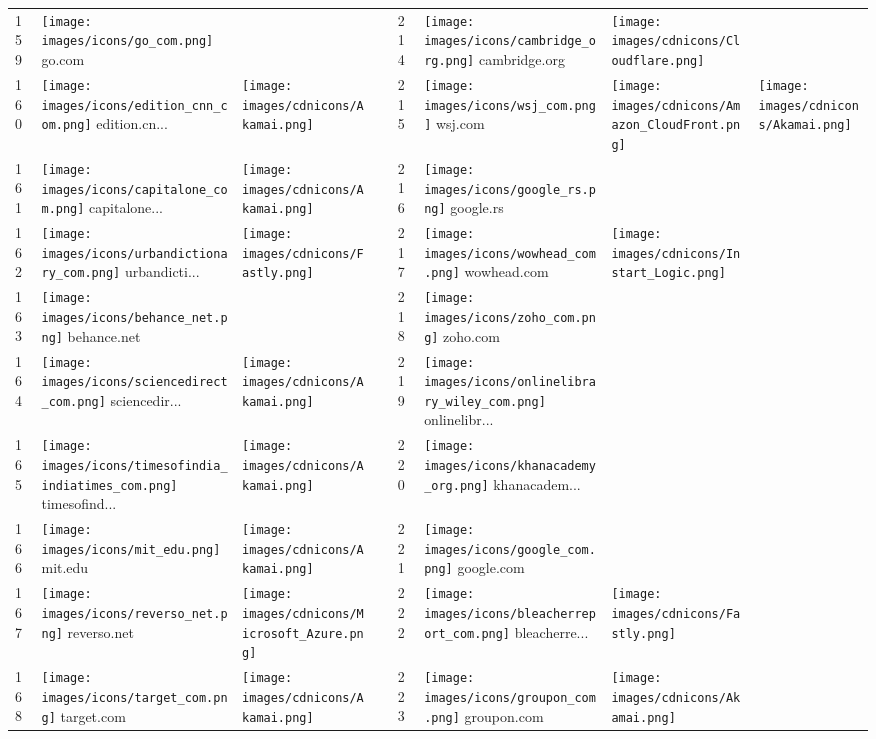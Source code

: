 \begin{table}[tbp]
\begin{tabular}{|llll|llll|}
159 & \texttt{[image: images/icons/go\_com.png]} go.com & & & 214 & \texttt{[image: images/icons/cambridge\_org.png]} cambridge.org & \texttt{[image: images/cdnicons/Cloudflare.png]} & \\
160 & \texttt{[image: images/icons/edition\_cnn\_com.png]} edition.cn... & \texttt{[image: images/cdnicons/Akamai.png]} & & 215 & \texttt{[image: images/icons/wsj\_com.png]} wsj.com & \texttt{[image: images/cdnicons/Amazon\_CloudFront.png]} & \texttt{[image: images/cdnicons/Akamai.png]} \\
161 & \texttt{[image: images/icons/capitalone\_com.png]} capitalone... & \texttt{[image: images/cdnicons/Akamai.png]} & & 216 & \texttt{[image: images/icons/google\_rs.png]} google.rs & & \\
162 & \texttt{[image: images/icons/urbandictionary\_com.png]} urbandicti... & \texttt{[image: images/cdnicons/Fastly.png]} & & 217 & \texttt{[image: images/icons/wowhead\_com.png]} wowhead.com & \texttt{[image: images/cdnicons/Instart\_Logic.png]} & \\
163 & \texttt{[image: images/icons/behance\_net.png]} behance.net & & & 218 & \texttt{[image: images/icons/zoho\_com.png]} zoho.com & & \\
164 & \texttt{[image: images/icons/sciencedirect\_com.png]} sciencedir... & \texttt{[image: images/cdnicons/Akamai.png]} & & 219 & \texttt{[image: images/icons/onlinelibrary\_wiley\_com.png]} onlinelibr... & & \\
165 & \texttt{[image: images/icons/timesofindia\_indiatimes\_com.png]} timesofind... & \texttt{[image: images/cdnicons/Akamai.png]} & & 220 & \texttt{[image: images/icons/khanacademy\_org.png]} khanacadem... & & \\
166 & \texttt{[image: images/icons/mit\_edu.png]} mit.edu & \texttt{[image: images/cdnicons/Akamai.png]} & & 221 & \texttt{[image: images/icons/google\_com.png]} google.com & & \\
167 & \texttt{[image: images/icons/reverso\_net.png]} reverso.net & \texttt{[image: images/cdnicons/Microsoft\_Azure.png]} & & 222 & \texttt{[image: images/icons/bleacherreport\_com.png]} bleacherre... & \texttt{[image: images/cdnicons/Fastly.png]} & \\
168 & \texttt{[image: images/icons/target\_com.png]} target.com & \texttt{[image: images/cdnicons/Akamai.png]} & & 223 & \texttt{[image: images/icons/groupon\_com.png]} groupon.com & \texttt{[image: images/cdnicons/Akamai.png]} & \\

\end{tabular}
\end{table}
